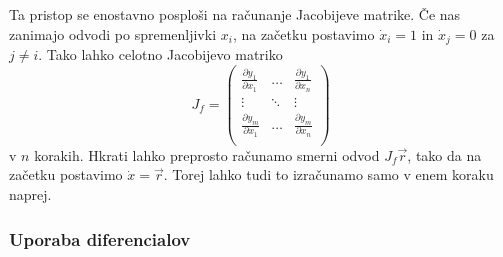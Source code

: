 \documentclass[12pt,slovene]{article}
\begin{document}
Ta pristop se enostavno posploši na računanje Jacobijeve matrike. Če nas zanimajo odvodi po spremenljivki $x_i$,
na začetku postavimo $\dot{x}_i=1$ in $\dot{x}_j=0$ za $j\neq i$.
Tako lahko celotno Jacobijevo matriko
$$J_f=
\begin{pmatrix}
\frac{\partial y_1}{\partial x_1}&
\ldots &
\frac{\partial y_1}{\partial x_n}\\
\vdots & \ddots & \vdots\\
\frac{\partial y_m}{\partial x_1}&
\ldots &
\frac{\partial y_m}{\partial x_n}\\
\end{pmatrix}
$$
v $n$ korakih.
Hkrati lahko preprosto računamo smerni odvod $J_f\vec{r}$,
tako da na začetku postavimo $\dot{x}=\vec{r}$.
Torej lahko tudi to izračunamo samo v enem koraku naprej.

\subsubsection{Uporaba diferencialov}
\end{document}
